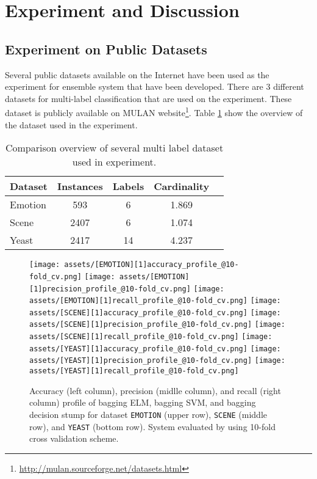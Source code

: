 \documentclass{article}
\begin{document}
\section{Experiment and Discussion}
\label{expr}

\subsection{Experiment on Public Datasets}
Several public datasets available on the Internet have been used as the experiment for ensemble system that have been developed. There are 3 different datasets for multi-label classification that are used on the experiment. These dataset is publicly available on MULAN website\footnote{\url{http://mulan.sourceforge.net/datasets.html}}. Table \ref{tab:dataset} show the overview of the dataset used in the experiment.

\begin{table}[t]
\caption{Comparison overview of several multi label dataset used in experiment.}
\label{tab:dataset}
\vskip 0.15in
\begin{center}
\begin{small}
\begin{sc}
\begin{tabular}{lcccr}
\hline
\abovespace\belowspace
Dataset & Instances & Labels & Cardinality \\
\hline
\abovespace
Emotion    	& 593 & 6 & 1.869 \\
Scene 		& 2407 & 6 & 1.074 \\
\belowspace
Yeast    	& 2417 & 14 & 4.237 \\
\hline
\end{tabular}
\end{sc}
\end{small}
\end{center}
\vskip -0.1in
\end{table}

\begin{figure*}[ht]
\vskip 0.2in
	\begin{subfigure}{}
	\centering
		\texttt{[image: assets/[EMOTION][1]accuracy\_profile\_@10-fold\_cv.png]}
		\texttt{[image: assets/[EMOTION][1]precision\_profile\_@10-fold\_cv.png]}
		\texttt{[image: assets/[EMOTION][1]recall\_profile\_@10-fold\_cv.png]}
		\texttt{[image: assets/[SCENE][1]accuracy\_profile\_@10-fold\_cv.png]}
		\texttt{[image: assets/[SCENE][1]precision\_profile\_@10-fold\_cv.png]}
		\texttt{[image: assets/[SCENE][1]recall\_profile\_@10-fold\_cv.png]}
		\texttt{[image: assets/[YEAST][1]accuracy\_profile\_@10-fold\_cv.png]}
		\texttt{[image: assets/[YEAST][1]precision\_profile\_@10-fold\_cv.png]}
		\texttt{[image: assets/[YEAST][1]recall\_profile\_@10-fold\_cv.png]}
		\caption{Accuracy (left column), precision (midlle column), and recall (right column) profile of bagging ELM, bagging SVM, and bagging decision stump for dataset \texttt{EMOTION} (upper row), \texttt{SCENE} (middle row), and \texttt{YEAST} (bottom row). System evaluated by using 10-fold cross validation scheme.}
	\end{subfigure}
\vskip -0.2in
\end{figure*} 
\end{document}
